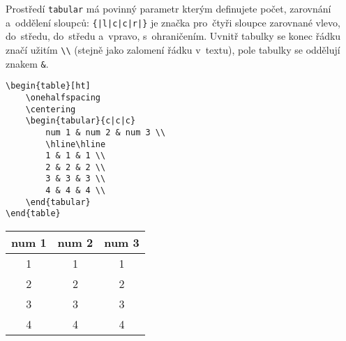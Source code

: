 Prostředí \texttt{tabular} má povinný parametr kterým definujete počet, zarovnání a~oddělení sloupců: \verb_{|l|c|c|r|}_ je značka pro~čtyři sloupce zarovnané vlevo, do~středu, do~středu a~vpravo, s~ohraničením.
Uvnitř tabulky se konec řádku značí užitím \verb|\\| (stejně jako zalomení řádku v~textu), pole tabulky se oddělují znakem \verb|&|.

\begin{mdframed}
\begin{verbatim}
\begin{table}[ht]
    \onehalfspacing
    \centering
    \begin{tabular}{c|c|c}
        num 1 & num 2 & num 3 \\
        \hline\hline
        1 & 1 & 1 \\
        2 & 2 & 2 \\
        3 & 3 & 3 \\
        4 & 4 & 4 \\ 
    \end{tabular}
\end{table}
\end{verbatim}
    \label{tbl:dvanact_hodnot}
    \begin{tabular}{c|c|c}
        num 1 & num 2 & num 3 \\
        \hline\hline
        1 & 1 & 1 \\
        2 & 2 & 2 \\
        3 & 3 & 3 \\
        4 & 4 & 4 \\ 
    \end{tabular}
\end{mdframed}
\FloatBarrier
